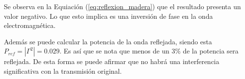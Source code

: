Se observa en la Equiación (\ref{eq:reflexion_madera}) que el resultado presenta un valor negativo. Lo que esto implica es una inversión de fase en la onda electromagnética.

Además se puede calcular la potencia de la onda reflejada, siendo esta $P_{ref} = |\Gamma^2| = 0.029$. Es así que se nota que menos de un $3\%$ de la potencia sera reflejada. De esta forma se puede afirmar que no habrá una interferencia significativa con la transmisión original. 

